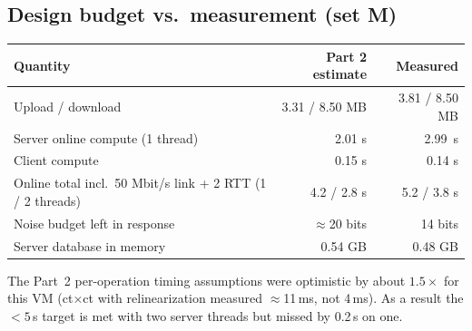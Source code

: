 \documentclass[11pt]{article}
\newcommand{\SrvMOne}{2.99}
\begin{document}
\subsection{Design budget vs.\ measurement (set M)}
\begin{center}\small
\begin{tabular}{@{}lrr@{}}
\toprule
Quantity & Part 2 estimate & Measured \\
\midrule
Upload / download & 3.31 / 8.50 MB & 3.81 / 8.50 MB \\
Server online compute (1 thread) & 2.01 s & \SrvMOne\ s \\
Client compute & 0.15 s & 0.14 s \\
Online total incl.\ 50 Mbit/s link + 2 RTT (1 / 2 threads) & 4.2 / 2.8 s & 5.2 / 3.8 s \\
Noise budget left in response & $\approx$20 bits & 14 bits \\
Server database in memory & 0.54 GB & 0.48 GB \\
\bottomrule
\end{tabular}
\end{center}
The Part~2 per-operation timing assumptions were optimistic by about $1.5\times$ for this VM (ct$\times$ct with relinearization measured $\approx$11\,ms, not 4\,ms). As a result the $<5$\,s target is met with two server threads but missed by 0.2\,s on one.
\end{document}
